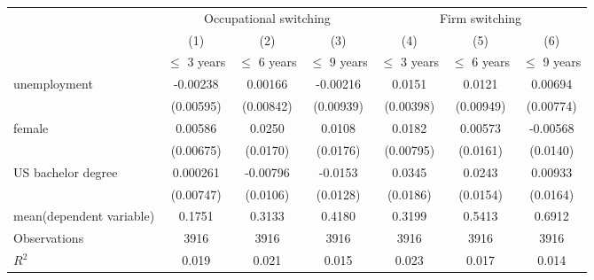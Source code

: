 \begin{table}[htbp]\centering
	\begin{adjustbox}{max width=1\textwidth}
		\begin{tabular}{l*{6}{c}}
			\hline\hline
			&\multicolumn{3}{c}{Occupational switching} & 			\multicolumn{3}{c}{Firm switching}\\
			&\multicolumn{1}{c}{(1)}&\multicolumn{1}{c}{(2)}&\multicolumn{1}{c}{(3)}&\multicolumn{1}{c}{(4)}&\multicolumn{1}{c}{(5)}&\multicolumn{1}{c}{(6)}\\
			&\multicolumn{1}{c}{$\le$ 3 years}&\multicolumn{1}{c}{$\le$ 6 years}&\multicolumn{1}{c}{$\le$ 9 years}&\multicolumn{1}{c}{$\le$ 3 years}&\multicolumn{1}{c}{$\le$ 6 years}&\multicolumn{1}{c}{$\le$ 9 years}\\
\hline
unemployment    &    -0.00238         &     0.00166         &    -0.00216         &      0.0151\sym{***}&      0.0121         &     0.00694         \\
            &   (0.00595)         &   (0.00842)         &   (0.00939)         &   (0.00398)         &   (0.00949)         &   (0.00774)         \\
[1em]
female  &     0.00586         &      0.0250         &      0.0108         &      0.0182\sym{*}  &     0.00573         &    -0.00568         \\
            &   (0.00675)         &    (0.0170)         &    (0.0176)         &   (0.00795)         &    (0.0161)         &    (0.0140)         \\
[1em]
US bachelor degree     &    0.000261         &    -0.00796         &     -0.0153         &      0.0345\sym{*}  &      0.0243         &     0.00933         \\
            &   (0.00747)         &    (0.0106)         &    (0.0128)         &    (0.0186)         &    (0.0154)         &    (0.0164)         \\
\hline
	mean(dependent variable)   &        0.1751         &          0.3133       &        0.4180         &        0.3199         &        0.5413         &        0.6912         \\
\hline
Observations       &        3916         &        3916         &        3916         &        3916         &        3916         &        3916         \\
\(R^{2}\)   &       0.019         &       0.021         &       0.015         &       0.023         &       0.017         &       0.014         \\

\end{tabular}
\end{adjustbox}
\end{table}
